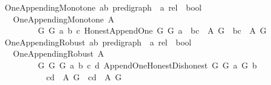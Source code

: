 \begin{isabellebody}
\ One{\isacharunderscore}{\kern0pt}Appending{\isacharunderscore}{\kern0pt}Monotone{\isacharcolon}{\kern0pt}{\isacharcolon}{\kern0pt}\ {\isachardoublequoteopen}{\isacharparenleft}{\kern0pt}{\isacharparenleft}{\kern0pt}{\isacharprime}{\kern0pt}a{\isacharcomma}{\kern0pt}{\isacharprime}{\kern0pt}b{\isacharparenright}{\kern0pt}\ pre{\isacharunderscore}{\kern0pt}digraph\ {\isasymRightarrow}\ {\isacharprime}{\kern0pt}a\ rel{\isacharparenright}{\kern0pt}\ {\isasymRightarrow}\ bool\ {\isachardoublequoteclose}\isanewline
\ \ \ {\isachardoublequoteopen}One{\isacharunderscore}{\kern0pt}Appending{\isacharunderscore}{\kern0pt}Monotone\ A\ {\isasymequiv}\isanewline
\ \ \ \ \ \ \ \ \ {\isacharparenleft}{\kern0pt}{\isasymforall}G\ G{\isacharprime}{\kern0pt}\ a\ b\ c{\isachardot}{\kern0pt}\ Honest{\isacharunderscore}{\kern0pt}Append{\isacharunderscore}{\kern0pt}One\ G\ G{\isacharprime}{\kern0pt}\ a\ {\isasymlongrightarrow}\ {\isacharparenleft}{\kern0pt}{\isacharparenleft}{\kern0pt}b{\isacharcomma}{\kern0pt}c{\isacharparenright}{\kern0pt}\ {\isasymin}\ {\isacharparenleft}{\kern0pt}A\ G{\isacharparenright}{\kern0pt}\ {\isasymlongrightarrow}\ {\isacharparenleft}{\kern0pt}b{\isacharcomma}{\kern0pt}c{\isacharparenright}{\kern0pt}\ {\isasymin}\ {\isacharparenleft}{\kern0pt}A\ G{\isacharprime}{\kern0pt}{\isacharparenright}{\kern0pt}{\isacharparenright}{\kern0pt}{\isacharparenright}{\kern0pt}{\isachardoublequoteclose}\isanewline
\isanewline
\isanewline
{}\isamarkupfalse%
\ One{\isacharunderscore}{\kern0pt}Appending{\isacharunderscore}{\kern0pt}Robust{\isacharcolon}{\kern0pt}{\isacharcolon}{\kern0pt}\ {\isachardoublequoteopen}{\isacharparenleft}{\kern0pt}{\isacharparenleft}{\kern0pt}{\isacharprime}{\kern0pt}a{\isacharcomma}{\kern0pt}{\isacharprime}{\kern0pt}b{\isacharparenright}{\kern0pt}\ pre{\isacharunderscore}{\kern0pt}digraph\ {\isasymRightarrow}\ {\isacharprime}{\kern0pt}a\ rel{\isacharparenright}{\kern0pt}\ {\isasymRightarrow}\ bool\ {\isachardoublequoteclose}\isanewline
\ \ \ {\isachardoublequoteopen}One{\isacharunderscore}{\kern0pt}Appending{\isacharunderscore}{\kern0pt}Robust\ A\ {\isasymequiv}\isanewline
\ \ \ \ \ \ \ \ \ {\isacharparenleft}{\kern0pt}{\isasymforall}G\ G{\isacharprime}{\kern0pt}\ G{\isacharprime}{\kern0pt}{\isacharprime}{\kern0pt}\ a\ b\ c\ d{\isachardot}{\kern0pt}\ Append{\isacharunderscore}{\kern0pt}One{\isacharunderscore}{\kern0pt}Honest{\isacharunderscore}{\kern0pt}Dishonest\ G\ G{\isacharprime}{\kern0pt}\ a\ G{\isacharprime}{\kern0pt}{\isacharprime}{\kern0pt}\ b\isanewline
\ \ \ \ \ \ \ \ \ \ {\isasymlongrightarrow}\ {\isacharparenleft}{\kern0pt}{\isacharparenleft}{\kern0pt}c{\isacharcomma}{\kern0pt}d{\isacharparenright}{\kern0pt}\ {\isasymin}\ {\isacharparenleft}{\kern0pt}A\ G{\isacharparenright}{\kern0pt}\ {\isasymlongrightarrow}\ {\isacharparenleft}{\kern0pt}c{\isacharcomma}{\kern0pt}d{\isacharparenright}{\kern0pt}\ {\isasymin}\ {\isacharparenleft}{\kern0pt}A\ G{\isacharprime}{\kern0pt}{\isacharprime}{\kern0pt}{\isacharparenright}{\kern0pt}{\isacharparenright}{\kern0pt}{\isacharparenright}{\kern0pt}{\isachardoublequoteclose}\isanewline

\end{isabellebody}
